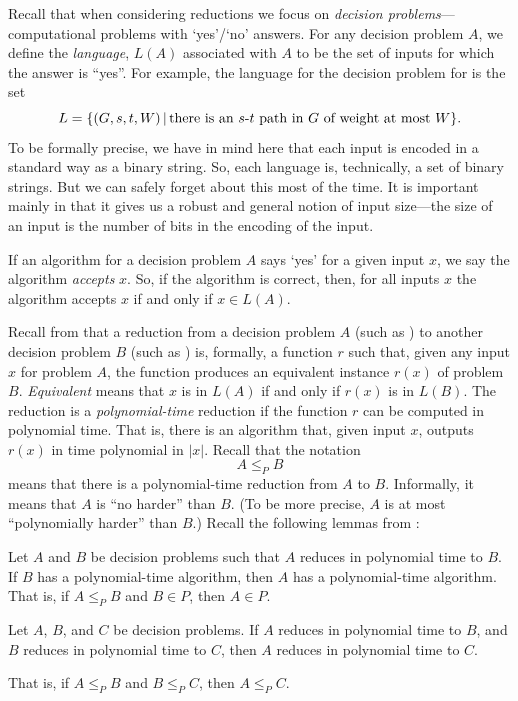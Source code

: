 \documentclass[11pt]{article}
\begin{document}
Recall that when considering reductions we focus on \emph{decision problems}---computational problems with `yes'/`no' answers.
For any decision problem $A$, we define the \emph{language}, $L(A)$ associated with $A$
to be the set of inputs for which the answer is ``yes''.  For example, the language
for the decision problem for 
is the set
\[L = \{ (G, s, t, W) \,|\, \text{there is an $s$-$t$ path in $G$ of weight at most $W$}\}.\]
To be formally precise,
we have in mind here that each input is encoded in a standard way
as a binary string. So, each language is, technically, a set of binary strings.
But we can safely forget about this most of the time.
It is important mainly in that it gives us a robust and general notion of input size---the size of an input is the number of bits in the encoding of the input.

If an algorithm for a decision problem $A$ says `yes' for a given input $x$,
we say the algorithm \emph{accepts} $x$.  
So, if the algorithm is correct, then, for all inputs $x$
the algorithm accepts $x$ if and only if $x\in L(A)$.

Recall from  that a reduction from a decision problem $A$ (such as )
to another decision problem $B$ (such as )
is, formally, a function $r$
such that, given any input $x$ for problem $A$,
the function produces an equivalent instance $r(x)$ of problem $B$.
\emph{Equivalent} means that $x$ is in $L(A)$
if and only if $r(x)$ is in $L(B)$.
The reduction is a \emph{polynomial-time} reduction if the function $r$ can be computed in polynomial time.
That is, there is an algorithm that, given input $x$, outputs $r(x)$ in time polynomial in $|x|$.
Recall that the notation \[
  A \le_P B
\] means that there is a polynomial-time reduction from $A$ to $B$.
Informally, it means that $A$ is ``no harder'' than $B$.
(To be more precise, $A$ is at most ``polynomially harder'' than $B$.)
Recall the following lemmas from :

\begin{lemma}\label{np: reduction}
  Let $A$ and $B$ be decision problems
  such that $A$ reduces in polynomial time to $B$.
  If $B$ has a polynomial-time algorithm,
  then $A$ has a polynomial-time algorithm.
  That is, if $A \le_P B$ and $B\in P$, then $A\in P$.
\end{lemma}

\begin{lemma}\label{np: transitive}
  Let $A$, $B$, and $C$ be decision problems.
  If $A$ reduces in polynomial time to $B$,
  and $B$ reduces in polynomial time to $C$,
  then $A$ reduces in polynomial time to $C$.

  That is, if $A\le_P B$ and $B\le_P C$, then $A\le_P C$.
\end{lemma}
\end{document}
